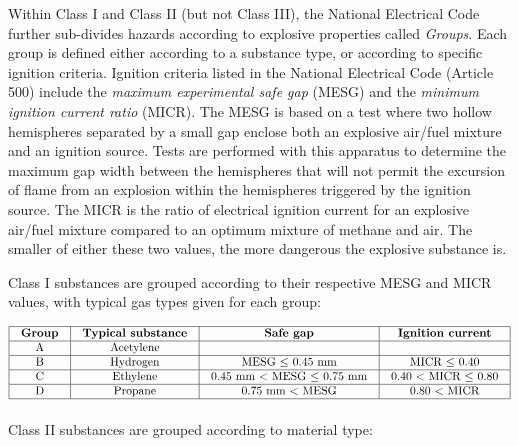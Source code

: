 Within Class I and Class II (but not Class III), the National Electrical Code further sub-divides hazards according to explosive properties called \textit{Groups}.  Each group is defined either according to a substance type, or according to specific ignition criteria.  Ignition criteria listed in the National Electrical Code (Article 500) include the \textit{maximum experimental safe gap} (MESG) and the \textit{minimum ignition current ratio} (MICR).  The MESG is based on a test where two hollow hemispheres separated by a small gap enclose both an explosive air/fuel mixture and an ignition source.  Tests are performed with this apparatus to determine the maximum gap width between the hemispheres that will not permit the excursion of flame from an explosion within the hemispheres triggered by the ignition source.  The MICR is the ratio of electrical ignition current for an explosive air/fuel mixture compared to an optimum mixture of methane and air.  The smaller of either these two values, the more dangerous the explosive substance is.      

\vskip 10pt

Class I substances are grouped according to their respective MESG and MICR values, with typical gas types given for each group: 


$$\vbox{\offinterlineskip
\halign{\strut
\vrule \quad\hfil # \ \hfil & 
\vrule \quad\hfil # \ \hfil & 
\vrule \quad\hfil # \ \hfil & 
\vrule \quad\hfil # \ \hfil \vrule \cr
\noalign{\hrule}
%
\textbf{Group} & \textbf{Typical substance} & \textbf{Safe gap} & \textbf{Ignition current} \cr
%
\noalign{\hrule}
%
A & Acetylene &  &  \cr
%
\noalign{\hrule}
%
B & Hydrogen & MESG $\leq$ 0.45 mm & MICR $\leq$ 0.40 \cr
%
\noalign{\hrule}
%
C & Ethylene & 0.45 mm $<$ MESG $\leq$ 0.75 mm & 0.40 $<$ MICR $\leq$ 0.80 \cr
%
\noalign{\hrule}
%
D & Propane & 0.75 mm $<$ MESG & 0.80 $<$ MICR \cr
%
\noalign{\hrule}
} %
}$$ %

\vskip 10pt

Class II substances are grouped according to material type:


